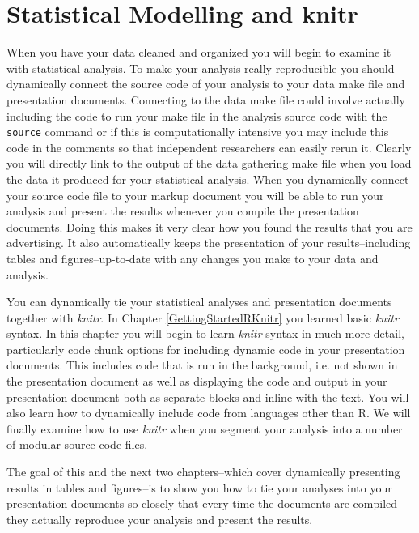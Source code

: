 



\chapter{Statistical Modelling and knitr}\label{StatsModel}


When you have your data cleaned and organized you will begin to examine it with statistical analysis. To make your analysis really reproducible you should dynamically connect the source code of your analysis to your data make file and presentation documents. Connecting to the data make file could involve actually including the code to run your make file in the analysis source code with the \texttt{source} command or if this is computationally intensive you may include this code in the comments so that independent researchers can easily rerun it. Clearly you will directly link to the output of the data gathering make file when you load the data it produced for your statistical analysis. When you dynamically connect your source code file to your markup document you will be able to run your analysis and present the results whenever you compile the presentation documents. Doing this makes it very clear how you found the results that you are advertising. It also automatically keeps the presentation of your results--including tables and figures--up-to-date with any changes you make to your data and analysis.

You can dynamically tie your statistical analyses and presentation documents together with {\emph{knitr}}. In Chapter \ref{GettingStartedRKnitr} you learned basic {\emph{knitr}} syntax. In this chapter you will begin to learn {\emph{knitr}} syntax in much more detail, particularly code chunk options for including dynamic code in your presentation documents. This includes code that is run in the background, i.e. not shown in the presentation document as well as displaying the code and output in your presentation document both as separate blocks and inline with the text. You will also learn how to dynamically include code from languages other than R. We will finally examine how to use {\emph{knitr}} when you segment your analysis into a number of modular source code files. 

The goal of this and the next two chapters--which cover dynamically presenting results in tables and figures--is to show you how to tie your analyses into your presentation documents so closely that every time the documents are compiled they actually reproduce your analysis and present the results.

